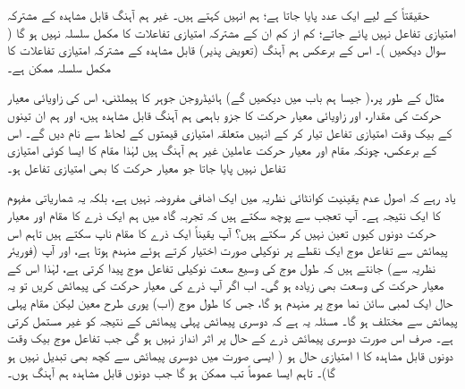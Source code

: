 حقیقتاً  کے لیے ایک عدد پایا جاتا ہے؛ ہم انہیں  کہتے ہیں۔ غیر ہم آہنگ قابل مشاہدہ کے مشترکہ امتیازی تفاعل نہیں پائے جاتے؛ کم از کم ان کے مشترکہ امتیازی تفاعلات کا مکمل سلسلہ نہیں ہو گا ( سوال  دیکھیں )۔ اس کے برعکس ہم آہنگ (تعویض پذیر) قابل مشاہدہ کے مشترکہ امتیازی تفاعلات کا مکمل سلسلہ ممکن ہے۔


مثال کے طور پر،( جیسا ہم باب  میں دیکھیں گے) ہائیڈروجن جوہر کا ہیملٹنی، اس کی زاویائی معیار حرکت کی مقدار، اور زاویائی معیار حرکت کا  جزو باہمی ہم آہنگ قابل مشاہدہ ہیں، اور ہم ان تینوں کے بیک وقت امتیازی تفاعل تیار کر کے انہیں متعلقہ امتیازی قیمتوں کے لحاظ سے نام دیں گے۔ اس کے برعکس، چونکہ مقام اور معیار حرکت عاملین غیر ہم آہنگ ہیں لہٰذا مقام کا ایسا کوئی امتیازی تفاعل نہیں پایا جاتا جو معیار حرکت کا بھی امتیازی تفاعل ہو۔

 یاد رہے کہ اصول عدم یقینیت کوانٹائی نظریہ میں ایک اضافی مفروضہ نہیں ہے، بلکہ یہ شماریاتی مفہوم کا ایک نتیجہ ہے۔ آپ تعجب سے پوچھ سکتے ہیں کہ تجربہ گاہ میں ہم ایک ذرے کا مقام اور معیار حرکت دونوں کیوں تعین نہیں کر سکتے ہیں؟ آپ یقیناً ایک ذرے کا مقام ناپ سکتے ہیں تاہم اس پیمائش سے تفاعل موج ایک نقطے پر نوکیلی صورت اختیار کرتے ہوئے منہدم ہوتا ہے، اور آپ (فوریئر نظریہ سے) جانتے ہیں کہ طول موج کی وسیع سعت نوکیلی تفاعل موج پیدا کرتی ہے، لہٰذا اس کے معیار حرکت کی وسعت بھی زیادہ ہو گی۔ اب اگر آپ ذرے کی معیار حرکت کی پیمائش کریں تو یہ حال ایک لمبی سائن نما موج پر منہدم ہو گا، جس کا طول موج (اب) پوری طرح معین لیکن مقام پہلی پیمائش سے مختلف ہو گا۔ مسئلہ یہ ہے کہ دوسری پیمائش پہلی پیمائش کے نتیجہ کو غیر مستمل کرتی ہے۔ صرف اس صورت دوسری پیمائش ذرے کے حال پر اثر انداز نہیں ہو گی جب تفاعل موج بیک وقت دونوں قابل مشاہدہ کا ا امتیازی حال ہو ( ایسی صورت میں دوسری پیمائش سے کچھ بھی تبدیل نہیں ہو گا)۔ تاہم ایسا عموماً تب ممکن ہو گا جب دونوں قابل مشاہدہ ہم آہنگ ہوں۔
 
